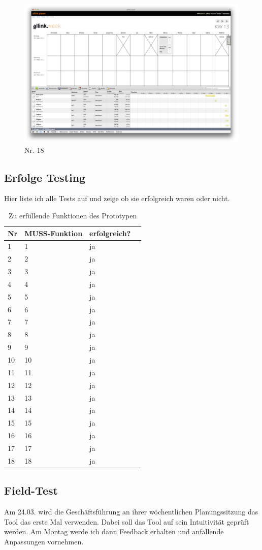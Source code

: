 \begin{figure}[htbp]
    \centering
        \includegraphics[width=0.99\textwidth,angle=0]{bilder/testing/tasks_sortieren.png}
    \caption{Nr. 18}
    \label{fig:bilder_testing_tasks_sortieren}
\end{figure}
\clearpage
\subsection{Erfolge Testing}
Hier liste ich alle Tests auf und zeige ob sie erfolgreich waren oder nicht.
\begin{table}[!ht]
\begin{center}
    \begin{tabular}{llp{8cm}l}
        \toprule Nr & MUSS-Funktion & erfolgreich? \\
        \midrule 1 & 1 & ja\\
        \midrule 2 & 2 & ja\\
        \midrule 3 & 3 & ja\\
        \midrule 4 & 4 & ja\\
        \midrule 5 & 5 & ja\\
        \midrule 6 & 6 & ja\\
        \midrule 7 & 7 & ja\\
        \midrule 8 & 8 & ja\\
        \midrule 9 & 9 & ja\\
        \midrule 10 & 10 & ja\\
        \midrule 11 & 11 & ja\\
        \midrule 12 & 12 & ja\\
        \midrule 13 & 13 & ja\\
        \midrule 14 & 14 & ja\\
        \midrule 15 & 15 & ja\\
        \midrule 16 & 16 & ja\\
        \midrule 17 & 17 & ja\\
        \midrule 18 & 18 & ja\\
        \bottomrule
    \end{tabular}
    \caption{Zu erfüllende Funktionen des Prototypen}
    \label{tab:testing_muss_funktionen_ziele}
\end{center}
\end{table}
\subsection{Field-Test}
Am 24.03. wird die Geschäftsführung an ihrer wöchentlichen Planungssitzung das Tool das erste Mal verwenden.
Dabei soll das Tool auf sein Intuitivität geprüft werden. Am Montag werde ich dann Feedback erhalten und anfallende Anpassungen vornehmen.

